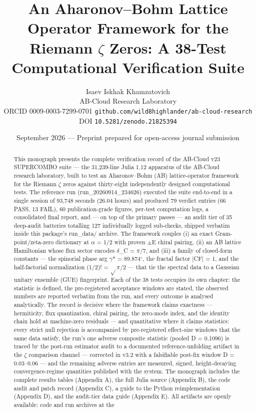 \documentclass[10pt]{article}
\begin{document}
\title{An Aharonov--Bohm Lattice Operator Framework for the Riemann $\zeta$ Zeros: A 38-Test Computational Verification Suite}
\author{Isaev Iskhak Khamzatovich\\
\small AB-Cloud Research Laboratory\\
\small ORCID 0009-0003-7299-0701 \quad\textbullet\quad \texttt{github.com/wild8highlander/ab-cloud-research} \quad\textbullet\quad DOI \texttt{10.5281/zenodo.21825394}}
\date{September 2026 --- Preprint prepared for open-access journal submission}
\maketitle

\begin{abstract}
This monograph presents the complete verification record of the AB-Cloud v23 SUPERCOMBO suite --- the 31,239-line Julia 1.12 apparatus of the AB-Cloud research laboratory, built to test an Aharonov--Bohm (AB) lattice-operator framework for the Riemann $\zeta$ zeros against thirty-eight independently designed computational tests. The reference run (run\_20260914\_234626) executed the suite end-to-end in a single session of 93,748 seconds (26.04 hours) and produced 79 verdict entries (66 PASS, 13 FAIL), 60 publication-grade figures, per-test computation logs, a consolidated final report, and --- on top of the primary passes --- an audit tier of 35 deep-audit batteries totalling 127 individually logged sub-checks, shipped verbatim inside this package's run\_data/ archive. The framework couples (i) an exact Gram-point/zeta-zero dictionary at $\alpha$ = 1/2 with proven $\pm$E chiral pairing, (ii) an AB lattice Hamiltonian whose flux sector encodes $\delta$\_C = $\pi$/7, and (iii) a family of closed-form constants --- the spinorial phase arg $\gamma$* = 89.874$^\circ$, the fractal factor |CF| = 1, and the half-factorial normalization (1/2)! = $\sqrt{}$$\pi$/2 --- that tie the spectral data to a Gaussian unitary ensemble (GUE) fingerprint. Each of the 38 tests occupies its own chapter: the statistic is defined, the pre-registered acceptance windows are stated, the observed numbers are reported verbatim from the run, and every outcome is analysed analytically. The record is decisive where the framework claims exactness --- hermiticity, flux quantization, chiral pairing, the zero-mode index, and the identity chain hold at machine-zero residuals --- and quantitative where it claims statistics: every strict null rejection is accompanied by pre-registered effect-size windows that the same data satisfy, the run's one adverse composite statistic (pooled D = 0.1096) is traced by the post-run estimator audit to a documented reference-unfolding artifact in the $\zeta$ comparison channel --- corrected in v3.2 with a falsifiable post-fix window D = 0.03--0.06 --- and the remaining adverse entries are measured, signed, height-decaying convergence-regime quantities published with the system. The monograph includes the complete results tables (Appendix A), the full Julia source (Appendix B), the code audit and patch record (Appendix C), a guide to the Python reimplementation (Appendix D), and the audit-tier data guide (Appendix E). All artifacts are openly available: code and run archives at the 
\end{abstract}
\end{document}

